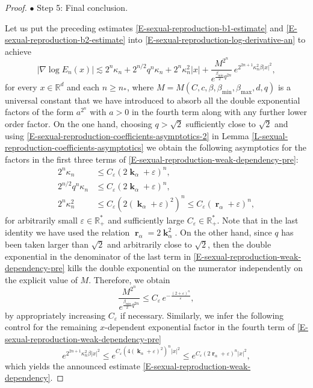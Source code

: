 \documentclass[reqno]{amsart}
\DeclareMathOperator{\bk}{\boldsymbol{k}}
\DeclareMathOperator{\br}{\boldsymbol{r}}
\numberwithin{equation}{section}
\begin{document}
{\begin{proof}
\medskip

$\bullet$ {\sc Step 5}: Final conclusion.

Let us put the preceding estimates \eqref{E-sexual-reproduction-b1-estimate} and \eqref{E-sexual-reproduction-b2-estimate} into \eqref{E-sexual-reproduction-log-derivative-an} to achieve
\begin{equation}\label{E-sexual-reproduction-weak-dependency-pre}
\vert \nabla \log E_n(x)\vert\lesssim 2^n\kappa_n+2^{n/2}q^n\kappa_n +2^n\kappa_n^2\vert x\vert+\frac{M^{2^n}}{e^{\frac{\beta_{\min}}{2} q^{2n}}}\,e^{2^{2n+1}\kappa_n^2\beta \vert x\vert^2},
\end{equation}
for every $x\in \mathbb{R}^d$ and each $n\geq n_*$, where $M=M(C,c,\beta,\beta_{\min},\beta_{\max},d,q)$ is a universal constant that we have introduced to absorb all the double exponential factors of the form $a^{2^n}$ with $a>0$ in the fourth term along with any further lower order factor. On the one hand, choosing $q>\sqrt{2}$ sufficiently close to $\sqrt{2}$ and using \eqref{E-sexual-reproduction-coefficients-asymptotics-2} in Lemma \ref{L-sexual-reproduction-coefficients-asymptotics} we obtain the following asymptotics for the factors in the first three terms of \eqref{E-sexual-reproduction-weak-dependency-pre}:
\begin{align*}
2^n\kappa_n&\leq C_\varepsilon(2\bk_\alpha+\varepsilon)^n,\\
2^{n/2} q^n\kappa_n&\leq C_\varepsilon (2\bk_\alpha+\varepsilon)^n,\\
2^n\kappa_n^2&\leq C_\varepsilon(2(\bk_\alpha+\varepsilon)^2)^n\leq C_\varepsilon(\br_\alpha+\varepsilon)^n,
\end{align*}
for arbitrarily small $\varepsilon\in \mathbb{R}_+^*$ and sufficiently large $C_\varepsilon\in \mathbb{R}_+^*$. Note that in the last identity we have used the relation $\br_\alpha=2\bk_\alpha^2$. On the other hand, since $q$ has been taken larger  than $\sqrt{2}$ and arbitrarily close to $\sqrt{2}$, then the double exponential in the denominator of the last term in \eqref{E-sexual-reproduction-weak-dependency-pre} kills the double exponential on the numerator independently on the explicit value of $M$. Therefore, we obtain 
$$\frac{M^{2^n}}{e^{\frac{\beta_{\min}}{2}q^{2n}}}\leq C_\varepsilon\,e^{-\frac{(2+\varepsilon)^n}{\varepsilon}},$$
by appropriately increasing $C_\varepsilon$ if necessary. Similarly, we infer the following control for the remaining $x$-dependent exponential factor in the fourth term of \eqref{E-sexual-reproduction-weak-dependency-pre}
$$e^{2^{2n+1}\kappa_n^2\beta \vert x\vert^2}\leq e^{C_\varepsilon (4(\bk_\alpha+\varepsilon)^2)^n\vert x\vert^2}\leq e^{C_\varepsilon(2\br_\alpha+\varepsilon)^n\vert x\vert^2},$$
which yields the announced estimate \eqref{E-sexual-reproduction-weak-dependency}.
\end{proof}

}
\end{document}
